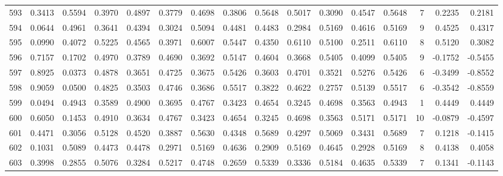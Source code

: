 \begin{tabular}{lrrrrrrrrrrrrrrr}
593 &      0.3413 &  0.5594 &  0.3970 &  0.4897 &  0.3779 &  0.4698 &  0.3806 &  0.5648 &  0.5017 &  0.3090 &   0.4547 &     0.5648 &      7 &                    0.2235 &                     0.2181 \\
594 &      0.0644 &  0.4961 &  0.3641 &  0.4394 &  0.3024 &  0.5094 &  0.4481 &  0.4483 &  0.2984 &  0.5169 &   0.4616 &     0.5169 &      9 &                    0.4525 &                     0.4317 \\
595 &      0.0990 &  0.4072 &  0.5225 &  0.4565 &  0.3971 &  0.6007 &  0.5447 &  0.4350 &  0.6110 &  0.5100 &   0.2511 &     0.6110 &      8 &                    0.5120 &                     0.3082 \\
596 &      0.7157 &  0.1702 &  0.4970 &  0.3789 &  0.4690 &  0.3692 &  0.5147 &  0.4604 &  0.3668 &  0.5405 &   0.4099 &     0.5405 &      9 &                   -0.1752 &                    -0.5455 \\
597 &      0.8925 &  0.0373 &  0.4878 &  0.3651 &  0.4725 &  0.3675 &  0.5426 &  0.3603 &  0.4701 &  0.3521 &   0.5276 &     0.5426 &      6 &                   -0.3499 &                    -0.8552 \\
598 &      0.9059 &  0.0500 &  0.4825 &  0.3503 &  0.4746 &  0.3686 &  0.5517 &  0.3822 &  0.4622 &  0.2757 &   0.5139 &     0.5517 &      6 &                   -0.3542 &                    -0.8559 \\
599 &      0.0494 &  0.4943 &  0.3589 &  0.4900 &  0.3695 &  0.4767 &  0.3423 &  0.4654 &  0.3245 &  0.4698 &   0.3563 &     0.4943 &      1 &                    0.4449 &                     0.4449 \\
600 &      0.6050 &  0.1453 &  0.4910 &  0.3634 &  0.4767 &  0.3423 &  0.4654 &  0.3245 &  0.4698 &  0.3563 &   0.5171 &     0.5171 &     10 &                   -0.0879 &                    -0.4597 \\
601 &      0.4471 &  0.3056 &  0.5128 &  0.4520 &  0.3887 &  0.5630 &  0.4348 &  0.5689 &  0.4297 &  0.5069 &   0.3431 &     0.5689 &      7 &                    0.1218 &                    -0.1415 \\
602 &      0.1031 &  0.5089 &  0.4473 &  0.4478 &  0.2971 &  0.5169 &  0.4636 &  0.2909 &  0.5169 &  0.4645 &   0.2928 &     0.5169 &      8 &                    0.4138 &                     0.4058 \\
603 &      0.3998 &  0.2855 &  0.5076 &  0.3284 &  0.5217 &  0.4748 &  0.2659 &  0.5339 &  0.3336 &  0.5184 &   0.4635 &     0.5339 &      7 &                    0.1341 &                    -0.1143 \\

\end{tabular}

